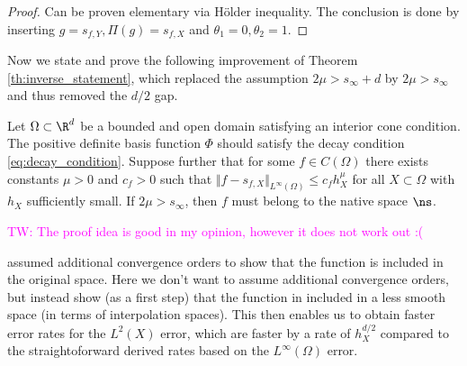 \documentclass[a4paper, 10pt]{article}
\newcommand{\tw}[1]{\textcolor{magenta}{TW: #1}}
\begin{document}
\begin{proof}
Can be proven elementary via Hölder inequality.
The conclusion is done by inserting $g = s_{f, Y}, \Pi(g) = s_{f, X}$ and $\theta_1 = 0, \theta_2 = 1$.
\end{proof}

Now we state and prove the following improvement of Theorem \ref{th:inverse_statement}, which replaced the assumption $2\mu > s_\infty + d$ by $2\mu > s_\infty$ and thus removed the $d/2$ gap.

\begin{theorem}
\label{th:inverse_statement_improved}
Let $\Omega \subset \R^d$ be a bounded and open domain satisfying an interior cone condition. 
The positive definite basis function $\Phi$ should satisfy the decay condition \ref{eq:decay_condition}. 
Suppose further that for some $f \in C(\Omega)$ there exists constants $\mu > 0$ and $c_f > 0$ such that $\Vert f - s_{f, X}\Vert_{L^\infty(\Omega)} \leq c_f h_X^\mu$ for all $X \subset \Omega$ with $h_X$ sufficiently small. 
If $2\mu > s_\infty$, then $f$ must belong to the native space $\ns$.
\end{theorem}

\tw{The proof idea is good in my opinion, however it does not work out :(}

\cite{schaback2002inverse} assumed additional convergence orders to show that the function is included in the original space.
Here we don't want to assume additional convergence orders, but instead show (as a first step) that the function in included in a less smooth space (in terms of interpolation spaces).
This then enables us to obtain faster error rates for the $L^2(X)$ error, which are faster by a rate of $h_X^{d/2}$ compared to the straightoforward derived rates based on the $L^\infty(\Omega)$ error.
\end{document}
